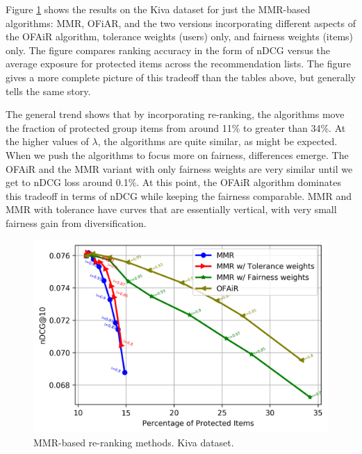 Figure \ref{fig:kiva_mmr_based_methods} shows the results on the Kiva dataset for just the MMR-based algorithms: MMR, OFiAR, and the two versions incorporating different aspects of the OFAiR algorithm, tolerance weights (users) only, and fairness weights (items) only. The figure compares ranking accuracy in the form of nDCG versus the average exposure for protected items across the recommendation lists. The figure gives a more complete picture of this tradeoff than the tables above, but generally tells the same story.

The general trend shows that by incorporating re-ranking, the algorithms move the fraction of protected group items from around 11\% to greater than 34\%. At the higher values of $\lambda$, the algorithms are quite similar, as might be expected. When we push the algorithms to focus more on fairness, differences emerge. The OFAiR and the MMR variant with only fairness weights are very similar until we get to nDCG loss around 0.1\%. At this point, the OFAiR algorithm dominates this tradeoff in terms of nDCG while keeping the fairness comparable. MMR and MMR with tolerance have curves that are essentially vertical, with very small fairness gain from diversification.

\begin{figure}[tbh]
    \centering
    \includegraphics[width=0.8\linewidth]{imgs/ofair/kiva_ndcg_itemCov_ActivityCountry_cut.png}
    \caption{MMR-based re-ranking methods. Kiva dataset.}
    \label{fig:kiva_mmr_based_methods}
\end{figure}

